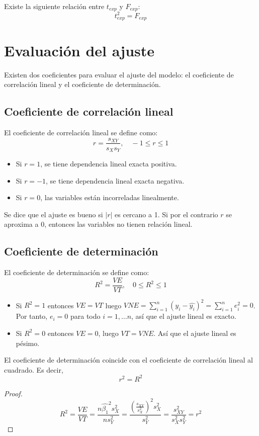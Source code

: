 \begin{remark}
    Existe la siguiente relación entre $t_{exp}$ y $F_{exp}$:
    $$t_{exp}^2 = F_{exp}$$
\end{remark}

\section{Evaluación del ajuste}
Existen dos coeficientes para evaluar el ajuste del modelo: el coeficiente de correlación lineal y el coeficiente de determinación.

\subsection*{Coeficiente de correlación lineal}
El coeficiente de correlación lineal se define como:
$$r = \frac{s_{XY}}{s_X s_Y}, \quad -1 \leq r \leq 1$$
\begin{itemize}
    \item Si $r = 1$, se tiene dependencia lineal exacta positiva.
    \item Si $r = -1$, se tiene dependencia lineal exacta negativa.
    \item Si $r = 0$, las variables están incorreladas linealmente.
\end{itemize}
Se dice que el ajuste es bueno si $|r|$ es cercano a 1.
Si por el contrario $r$ se aproxima a 0, entonces las variables no tienen relación lineal.

\subsection*{Coeficiente de determinación}
El coeficiente de determinación se define como:
$$R^2 = \frac{VE}{VT}, \quad 0 \leq R^2 \leq 1$$
\begin{itemize}
    \item Si $R^2 = 1$ entonces $VE = VT$ luego $VNE = \sum_{i=1}^n (y_i - \hat{y_i})^2 = \sum_{i=1}^n e_i^2 = 0$.
          Por tanto, $e_i = 0$ para todo $i = 1, \dots n$, así que el ajuste lineal es exacto.
    \item Si $R^2 = 0$ entonces $VE = 0$, luego $VT = VNE$.
          Así que el ajuste lineal es pésimo.
\end{itemize}

\begin{theorem}
    El coeficiente de determinación coincide con el coeficiente de correlación lineal al cuadrado.
    Es decir, $$r^2 = R^2$$

    \begin{proof}
        $$R^2 = \frac{VE}{VT} = \frac{n\hat{\beta_1}^2s_X^2}{ns_Y^2} = \frac{\left(\frac{s_{XY}}{s_X^2}\right)^2 s_X^2}{s_Y^2} = \frac{s_{XY}^2}{s_X^2 s_Y^2} = r^2$$
    \end{proof}
\end{theorem}

